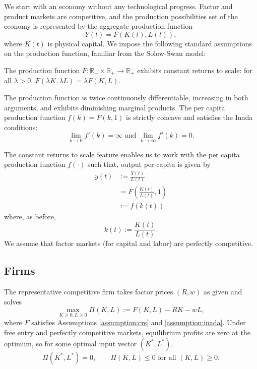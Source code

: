 \documentclass[\topdir/lecture\_notes.tex]{subfiles}
\begin{document}
We start with an economy without any technological progress.
Factor and product markets are competitive, and the production possibilities set of the economy is represented by the aggregate production function
\[
  Y(t)=F(K(t), L(t)),
\]
where \(K(t)\) is physical capital.
We impose the following standard assumptions on the production function, familiar from the Solow-Swan model:
\begin{assumption}
  \label{assumption:crs}
  The production function \(F: \mathbb{R}_+ \times \mathbb{R}_+ \to \mathbb{R}_+\) exhibits constant returns to scale: for all \(\lambda > 0\), \(F(\lambda K, \lambda L) = \lambda F(K, L)\).
\end{assumption}

\begin{assumption}
  \label{assumption:inada}
  The production function is twice continuously differentiable, increasing in both arguments, and exhibits diminishing marginal products. The per capita production function \(f(k) = F(k, 1)\) is strictly concave and satisfies the Inada conditions:
  \[
    \lim_{k \to 0} f'(k) = \infty \text{ and } \lim_{k \to \infty} f'(k) = 0.
  \]
\end{assumption}

The constant returns to scale feature enables us to work with the per capita production function \(f(\cdot)\) such that, output per capita is given by
\[
  \begin{aligned}
    y(t) & := \frac{Y(t)}{L(t)}                \\
         & =F\left(\frac{K(t)}{L(t)}, 1\right) \\
         & := f(k(t))
  \end{aligned}
\]
where, as before,
\[
  k(t) := \frac{K(t)}{L(t)}.
\]
We assume that factor markets (for capital and labor) are perfectly competitive.

\subsection{Firms}

The representative competitive firm takes factor prices \((R,w)\) as given and solves
\begin{equation*}
  \max_{K\ge 0,L\ge 0} \Pi(K,L):=F(K,L)-RK-wL,
\end{equation*}
where \(F\) satisfies Assumptions \ref{assumption:crs} and \ref{assumption:inada}.
Under free entry and perfectly competitive markets, equilibrium profits are zero at the optimum, so for some optimal input vector \((K^{*},L^{*})\),
\begin{equation}
  \Pi(K^{*},L^{*})=0,
  \qquad
  \Pi(K,L)\le 0 \text{ for all } (K,L)\ge 0.
  \label{eq:zero-profit-opt}
\end{equation}
\end{document}
